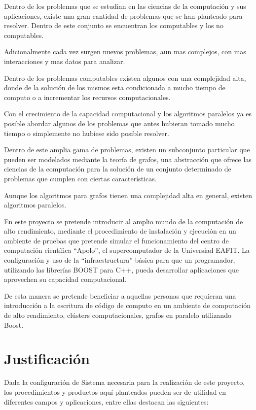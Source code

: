 Dentro de los problemas que se estudian en las ciencias de la computación y sus aplicaciones, existe una gran cantidad de problemas que se han planteado para resolver. Dentro de este conjunto se encuentran los computables y los no computables. 

Adicionalmente cada vez surgen nuevos problemas, aun mas complejos, con mas interacciones y mas datos para analizar. 

Dentro de los problemas computables existen algunos con una complejidad alta, donde de la solución de los mismos esta condicionada a mucho tiempo de computo o a incrementar los recursos computacionales.

 Con el crecimiento de la capacidad computacional y los algoritmos paralelos ya es posible abordar algunos de los problemas que antes hubieran tomado mucho tiempo o simplemente no hubiese sido posible resolver. 

Dentro de este amplia gama de problemas, existen un subconjunto particular que pueden ser modelados mediante la teoría de grafos, una  abstracción  que ofrece las ciencias de la computación para la solución de un conjunto determinado de problemas que cumplen con ciertas características. 

Aunque los algoritmos para grafos tienen una complejidad alta en general, existen algoritmos paralelos.

En este proyecto se pretende introducir al amplio mundo de la computación de alto rendimiento, mediante	el procedimiento de instalación y ejecución en un ambiente de pruebas que pretende simular el funcionamiento del centro de computación científica ``Apolo'', el supercomputador de la Universiad EAFIT. La configuración y uso de la ``infraestructura'' básica para que un programador, utilizando las librerías BOOST para C++, pueda desarrollar aplicaciones que aprovechen su capacidad computacional. 

De esta manera se pretende beneficiar a aquellas personas que requieran una introducción a la escritura de código  de computo en un ambiente de computación de alto rendimiento, clústers computacionales, grafos en paralelo utilizando Boost.

\section{Justificación}

Dada la configuración de Sistema necesaria para la realización de este proyecto, los procedimientos y productos aquí planteados pueden ser de utilidad en diferentes campos y aplicaciones, entre ellas destacan las siguientes:  

